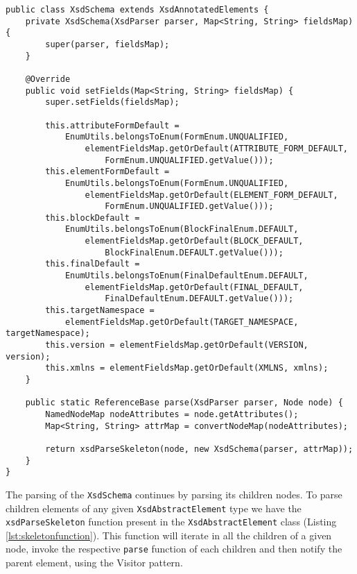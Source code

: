 \begin{lstlisting}[caption={XsdSchema Information Extraction (Simplified)},captionpos=b,label={lst:xsdschemaparsing}]
public class XsdSchema extends XsdAnnotatedElements {
    private XsdSchema(XsdParser parser, Map<String, String> fieldsMap){
        super(parser, fieldsMap);
    }
    
    @Override
    public void setFields(Map<String, String> fieldsMap) {
        super.setFields(fieldsMap);

        this.attributeFormDefault = 
        	EnumUtils.belongsToEnum(FormEnum.UNQUALIFIED, 				
        		elementFieldsMap.getOrDefault(ATTRIBUTE_FORM_DEFAULT, 
        			FormEnum.UNQUALIFIED.getValue()));
        this.elementFormDefault = 			 
        	EnumUtils.belongsToEnum(FormEnum.UNQUALIFIED, 		
        		elementFieldsMap.getOrDefault(ELEMENT_FORM_DEFAULT, 	
        			FormEnum.UNQUALIFIED.getValue()));
        this.blockDefault = 		
        	EnumUtils.belongsToEnum(BlockFinalEnum.DEFAULT, 		
        		elementFieldsMap.getOrDefault(BLOCK_DEFAULT, 	
        			BlockFinalEnum.DEFAULT.getValue()));
        this.finalDefault = 
        	EnumUtils.belongsToEnum(FinalDefaultEnum.DEFAULT, 
        		elementFieldsMap.getOrDefault(FINAL_DEFAULT, 
        			FinalDefaultEnum.DEFAULT.getValue()));
        this.targetNamespace = 
        	elementFieldsMap.getOrDefault(TARGET_NAMESPACE, targetNamespace);
        this.version = elementFieldsMap.getOrDefault(VERSION, version);
        this.xmlns = elementFieldsMap.getOrDefault(XMLNS, xmlns);
    }
    
    public static ReferenceBase parse(XsdParser parser, Node node) {
        NamedNodeMap nodeAttributes = node.getAttributes();
        Map<String, String> attrMap = convertNodeMap(nodeAttributes);        
    
        return xsdParseSkeleton(node, new XsdSchema(parser, attrMap));
    }
}
\end{lstlisting}

\noindent
The parsing of the \texttt{XsdSchema} continues by parsing its children nodes. To parse children elements of any given \texttt{XsdAbstractElement} type we have the \texttt{xsdParseSkeleton} function present in the \texttt{XsdAbstractElement} class (Listing \ref{lst:skeletonfunction}). This function will iterate in all the children of a given node, invoke the respective \texttt{parse} function of each children and then notify the parent element, using the Visitor pattern\cite{gamma1994design}. 

